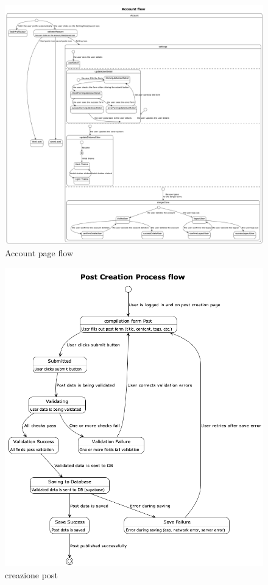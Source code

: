 \documentclass{article}
\begin{document}
\begin{figure}[h]
    \lefting
    \includegraphics[width=1.3\textwidth]{account_page_flow}
    \caption{Account page flow}
\end{figure}

\begin{figure}[h]
    \lefting
    \includegraphics[width=1.3\textwidth]{creazione_post_flow}
    \caption{creazione post}
    \label{fig:figure3}
\end{figure}
\end{document}
